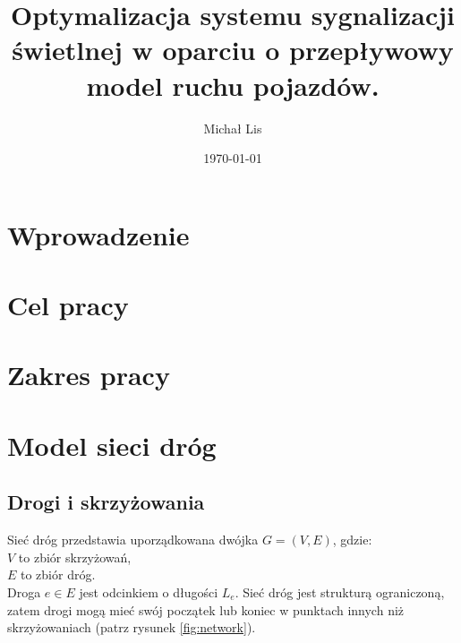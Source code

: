 \documentclass[12pt]{book}
\begin{document}
\title{Optymalizacja  systemu sygnalizacji świetlnej w 
oparciu o przepływowy model ruchu pojazdów.}
\author{Michał Lis}
\date{\today}
\maketitle
\tableofcontents
\chapter{Wprowadzenie}
\chapter{Cel pracy}
\chapter{Zakres pracy}
   
\chapter{Model sieci dróg}
\section{Drogi i skrzyżowania}
Sieć dróg przedstawia uporządkowana dwójka $G=(V,E)$, gdzie:\\ 
$V$ to zbiór skrzyżowań,\\
$E$ to zbiór dróg.\\
Droga $e \in E$ jest odcinkiem o długości $L_e$. Sieć dróg jest strukturą ograniczoną, zatem drogi mogą mieć swój początek lub koniec w punktach innych niż skrzyżowaniach (patrz rysunek \ref{fig:network}).

\end{document}
